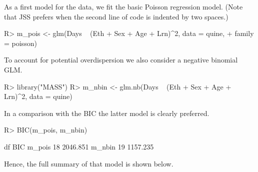 \documentclass[article]{jss}
\begin{document}
As a first model for the  data, we fit the basic Poisson regression
model. (Note that JSS prefers when the second line of code is indented by two
spaces.)
%
\begin{Schunk}
\begin{Sinput}
R> m_pois <- glm(Days ~ (Eth + Sex + Age + Lrn)^2, data = quine,
+    family = poisson)
\end{Sinput}
\end{Schunk}
%
To account for potential overdispersion we also consider a negative binomial
GLM.
%
\begin{Schunk}
\begin{Sinput}
R> library("MASS")
R> m_nbin <- glm.nb(Days ~ (Eth + Sex + Age + Lrn)^2, data = quine)
\end{Sinput}
\end{Schunk}
%
In a comparison with the BIC the latter model is clearly preferred.
%
\begin{Schunk}
\begin{Sinput}
R> BIC(m_pois, m_nbin)
\end{Sinput}
\begin{Soutput}
       df      BIC
m_pois 18 2046.851
m_nbin 19 1157.235
\end{Soutput}
\end{Schunk}
%
Hence, the full summary of that model is shown below.
%
\end{document}
